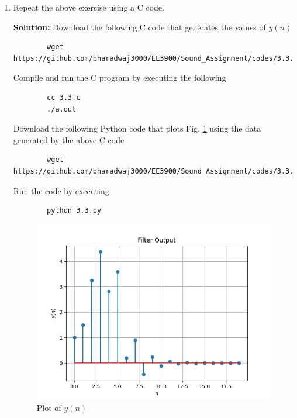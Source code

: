 \documentclass[journal,12pt,twocolumn]{IEEEtran}
\newcommand{\solution}{\noindent \textbf{Solution: }}
\numberwithin{equation}{section}
\renewcommand\thesection{\arabic{section}}
\begin{document}
\begin{enumerate}[label=\thesection.\arabic*,ref=\thesection.\theenumi]
	\item Repeat the above exercise using a C code.
	
	\solution Download the following C code that generates the values of $y(n)$
	\begin{lstlisting}
		wget https://github.com/bharadwaj3000/EE3900/Sound_Assignment/codes/3.3.c
	\end{lstlisting}
	
	Compile and run the C program by executing the following
	\begin{lstlisting}
		cc 3.3.c
		./a.out
	\end{lstlisting}
	
	Download the following Python code that plots Fig. \ref{fig-3.3} using the data generated by the above C code
	\begin{lstlisting}
		wget https://github.com/bharadwaj3000/EE3900/Sound_Assignment/codes/3.3.py
	\end{lstlisting}
	
	Run the code by executing
	\begin{lstlisting}
		python 3.3.py
	\end{lstlisting}

	\begin{figure}[!ht]
		\centering
		\includegraphics[width=\columnwidth]{./figs/3.3.png}
		\caption{Plot of $y(n)$}
		\label{fig-3.3}	
	\end{figure}
	
	\end{enumerate}
	
\end{document}
